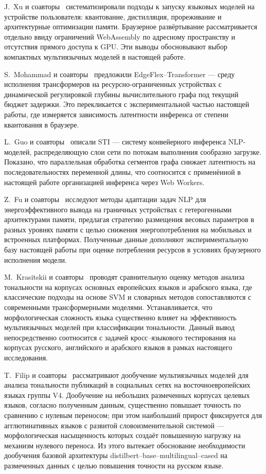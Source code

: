 J.~Xu и соавторы~\cite{xu2024ondevice} систематизировали подходы к запуску языковых моделей на устройстве пользователя: квантование, дистилляция, прореживание и архитектурные оптимизации памяти. Браузерное развёртывание рассматривается отдельно ввиду ограничений WebAssembly по адресному пространству и отсутствия прямого доступа к GPU. Эти выводы обосновывают выбор компактных мультиязычных моделей в настоящей работе.

S.~Mohammad и соавторы~\cite{mohammad2024edgeflex} предложили EdgeFlex--Transformer — среду исполнения трансформеров на ресурсно-ограниченных устройствах с динамической регулировкой глубины вычислительного графа под текущий бюджет задержки. Это перекликается с экспериментальной частью настоящей работы, где измеряется зависимость латентности инференса от степени квантования в браузере.

L.~Guo и соавторы~\cite{guo2023sti} описали STI — систему конвейерного инференса NLP-моделей, распределяющую слои сети по потокам выполнения сообразно загрузке. Показано, что параллельная обработка сегментов графа снижает латентность на последовательностях переменной длины, что соотносится с применённой в настоящей работе организацией инференса через Web Workers.
 
Z.~Fu и соавторы~\cite{fu2023energynlp} исследуют методы адаптации задач NLP для энергоэффективного вывода на граничных устройствах с гетерогенными архитектурами памяти, предлагая стратегию размещения весовых параметров в разных уровнях памяти с целью снижения энергопотребления на мобильных и встроенных платформах. Полученные данные дополняют экспериментальную базу настоящей работы при оценке потребления ресурсов в условиях браузерного исполнения модели.
 
M.~Krasitskii и соавторы~\cite{krasitskii2025sentiment} проводят сравнительную оценку методов анализа тональности на корпусах основных европейских языков и арабского языка, где классические подходы на основе SVM и словарных методов сопоставляются с современными трансформерными моделями. Устанавливается, что морфологическая сложность языка существенно влияет на эффективность мультиязычных моделей при классификации тональности. Данный вывод непосредственно соотносится с задачей кросс–языкового тестирования на корпусах русского, английского и арабского языков в рамках настоящего исследования.
 
T.~Filip и соавторы~\cite{filip2024finetuning} рассматривают дообучение мультиязычных моделей для анализа тональности публикаций в социальных сетях на восточноевропейских языках группы V4. Дообучение на небольших размеченных корпусах целевых языков, согласно полученным данным, существенно повышает точность по сравнению с нулевым переносом; при этом наибольший прирост фиксируется для агглютинативных языков с развитой словоизменительной системой — морфологическая насыщенность которых создаёт повышенную нагрузку на механизм нулевого переноса. Из этого вытекает обоснование необходимости дообучения базовой архитектуры distilbert–base–multilingual–cased на размеченных данных с целью повышения точности на русском языке.
 
